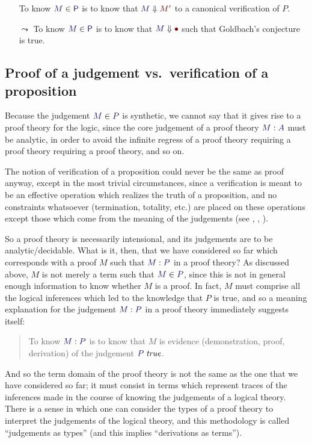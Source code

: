 \begin{itemize}
  \item[] To know $\ver{M}{\mathsf{P}}$ is to know that $\reduce{M}{M'}$ to a
    canonical verification of $P$.
  \item[$\leadsto$] To know $\ver{M}{\mathsf{P}}$ is to know that
    $\reduce{M}{\bullet}$ such that Goldbach's conjecture is true.
\end{itemize}

\subsection{Proof of a judgement vs.\ verification of a proposition}

Because the judgement $\ver{M}{P}$ is synthetic, we cannot say that it
gives rise to a proof theory for the logic, since the core judgement
of a proof theory $\ofty{M}{A}$ must be analytic, in order to avoid the
infinite regress of a proof theory requiring a proof theory requiring
a proof theory, and so on.

The notion of verification of a proposition could never be the same as proof
anyway, except in the most trivial circumstances, since a verification is meant
to be an effective operation which realizes the truth of a proposition, and no
constraints whatsoever (termination, totality, etc.) are placed on these
operations except those which come from the meaning of the judgements (see
\cite{Dummett:Elements}, \cite{Prawitz12}, \cite{TroelstraA:conm}).

So a proof theory is necessarily intensional, and its judgements are to be
analytic/decidable. What is it, then, that we have considered so far which
corresponds with a proof $M$ such that $\ofty{M}{P}$ in a proof theory? As discussed
above, $M$ is not merely a term such that $\ver{M}{P}$, since this is not in
general enough information to know whether $M$ is a proof. In fact, $M$ must
comprise all the logical inferences which led to the knowledge that $P$ is
true, and so a meaning explanation for the judgement $\ofty{M}{P}$ in a proof theory
immediately suggests itself:
\begin{quote}
  To know $\ofty{M}{P}$ is to know that $M$ is evidence (demonstration, proof,
  derivation) of the judgement $\istrue{P}$.
\end{quote}

And so the term domain of the proof theory is not the same as the one that we
have considered so far; it must consist in terms which represent traces of the
inferences made in the course of knowing the judgements of a logical theory.
There is a sense in which one can consider the types of a proof theory to
interpret the judgements of the logical theory, and this methodology is called
``judgements as types'' (and this implies ``derivations as terms'').

